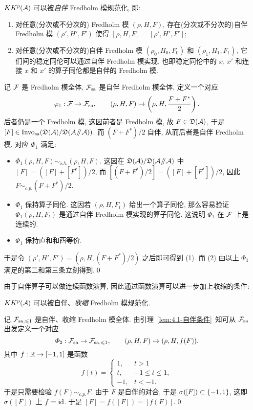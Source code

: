 \begin{Lemma}\label{lem:4.1-自伴条件}
	$ KK^p(\mathcal{A}) $ 可以被\textit{自伴} Fredholm 模规范化, 即:
	\begin{enumerate}[(N1)]
		\item 对任意(分次或不分次的) Fredholm 模 $ (\rho, H, F) $, 存在(分次或不分次的)自伴 Fredholm 模 $ (\rho', H', F') $ 使得 $ [\rho, H, F]=[\rho', H', F'] $;
		\item 对任意(分次或不分次的)自伴 Fredholm 模 $ (\rho_0, H_0, F_0) $ 和 $ (\rho_1, H_1, F_1) $, 它们间的稳定同伦可以通过自伴 Fredholm 模实现, 也即稳定同伦中的 $ x $, $ x' $ 和连接 $ x $ 和 $ x' $ 的算子同伦都是自伴的 Fredholm 模.
	\end{enumerate}
\end{Lemma}
\begin{Proof}
	记 $ \mathcal{F} $ 是 Fredholm 模全体, $ \mathcal{F}_{\text{sa}} $ 是自伴 Fredholm 模全体. 定义一个对应
	\[
		\varphi_1 : \mathcal{F}\to\mathcal{F}_{\text{sa}},\qquad (\rho, H, F)\mapsto\left(\rho, H, \frac{F+F^*}{2}\right).
	\]
	后者仍是一个 Fredholm 模, 这因前者是 Fredholm 模, 故 $ F\in\mathfrak{D}(\mathcal{A}) $, 于是 $ [F]\in\text{Invo}_{\text{sa}}(\mathfrak{D}(\mathcal{A})/\mathfrak{D}(\mathcal{A}\mathbin{\!/\mkern-5mu/\!}\mathcal{A})) $. 而 $ (F+F^*)/2 $ 自伴, 从而后者是自伴 Fredholm 模. 对应 $ \varPhi_1 $ 满足:
	\begin{itemize}
		\item $ \varPhi_1(\rho, H, F)\sim_{s.h.}(\rho, H, F) $. 这因在 $ \mathfrak{D}(\mathcal{A})/\mathfrak{D}(\mathcal{A}\mathbin{\!/\mkern-5mu/\!}\mathcal{A}) $ 中 $ [F]=([F]+[F^*])/2 $, 而 $ [(F+F^*)/2]=([F]+[F^*])/2 $, 因此 $ F\sim_{c.p.}(F+F^*)/2 $.
		\item $ \varPhi_1 $ 保持算子同伦. 这因若 $ (\rho, H, F_t) $ 给出一个算子同伦, 那么容易验证 $ \varPhi_1(\rho, H, F_t) $ 是通过自伴 Fredholm 模实现的算子同伦. 这说明 $ \varPhi_1 $ 在 $ \mathcal{F} $ 上是连续的.
		\item $ \varPhi_1 $ 保持直和和酉等价.
	\end{itemize}
	于是令 $ (\rho', H', F')=(\rho, H, (F+F^*)/2) $ 之后即可得到 (1). 而 (2) 由以上 $ \varPhi_1 $ 满足的第二和第三条立刻得到.\qed
\end{Proof}

由于自伴算子可以做连续函数演算, 因此通过函数演算可以进一步加上收缩的条件:

\begin{Lemma}\label{lem:4.1-收缩条件}
	$ KK^p(\mathcal{A}) $ 可以被自伴、\textit{收缩} Fredholm 模规范化.
\end{Lemma}
\begin{Proof}
	记 $ \mathcal{F}_{\text{sa},\leqslant 1} $ 是自伴、收缩 Fredholm 模全体. 由引理~\ref{lem:4.1-自伴条件}~知可从 $ \mathcal{F}_{\text{sa}} $ 出发定义一个对应
	\[
		\varPhi_2 : \mathcal{F}_{\text{sa}}\to\mathcal{F}_{\text{sa},\leqslant 1},\qquad (\rho, H, F)\mapsto(\rho, H, f(F)).
	\]
	其中 $ f : \mathbb{R}\to[-1,1] $ 是函数
	\[
		f(t)=\begin{cases}
			1, & t>1\\ t, & -1\leqslant t\leqslant 1,\\ -1, & t<-1.
		\end{cases}
	\]
	于是只需要检验 $ f(F)\sim_{c.p.}F $. 由于 $ F $ 是自伴的对合, 于是 $ \sigma([F])\subset\left\{ -1,1 \right\} $, 这即 $ \sigma([F]) $ 上 $ f=\mathrm{id} $. 于是 $ [F]=f([F])=[f(F)] $.\qed
\end{Proof}

